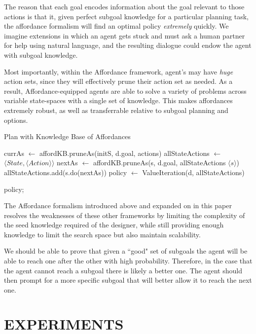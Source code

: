 \documentclass[]{article}
\begin{document}
The reason that each goal encodes information about the goal relevant to those actions is that it, given perfect subgoal knowledge for a particular planning task, the affordance formalism will find an optimal policy {\it extremely} quickly. We imagine extensions in which an agent gets stuck and must ask a human partner for help using natural language, and the resulting dialogue could endow the agent with subgoal knowledge.

Most importantly, within the Affordance framework, agent's may have {\it huge} action sets, since they will effectively prune their action set as needed. As a result, Affordance-equipped agents are able to solve a variety of problems across variable state-spaces with a single set of knowledge. This makes affordances extremely robust, as well as transferrable relative to subgoal planning and options.


\begin{algorithm}
  \caption{Plan with Knowledge Base of Affordances}

  \begin{algorithmic}
    \State {}
    \State currAs $\gets$ affordKB.pruneAs(initS, d.goal, actions)
    \State allStateActions $\gets$ $\langle State ,\langle Action \rangle \rangle$
	\State nextAs $\gets$ affordKB.pruneAs(s, d.goal, allStateActions $\langle s \rangle$)
	\State allStateActions.add(s.do(nextAs))
    \EndFor
    \State {}
    \State policy $\gets$ ValueIteration(d, allStateActions)
    
    \Return policy;
  \end{algorithmic}
\end{algorithm}


The Affordance formalism introduced above and expanded on in this paper resolves the weaknesses of these other frameworks by limiting the complexity of the seed knowledge required of the designer, while still providing enough knowledge to limit the search space but also maintain scalability.

We should be able to prove that given a ``good" set of subgoals the agent will be able to reach one after the other with high probability. Therefore, in the case that the agent cannot reach a subgoal there is likely a better one. The agent should then prompt for a more specific subgoal that will better allow it to reach the next one.

\section{EXPERIMENTS}
\end{document}
